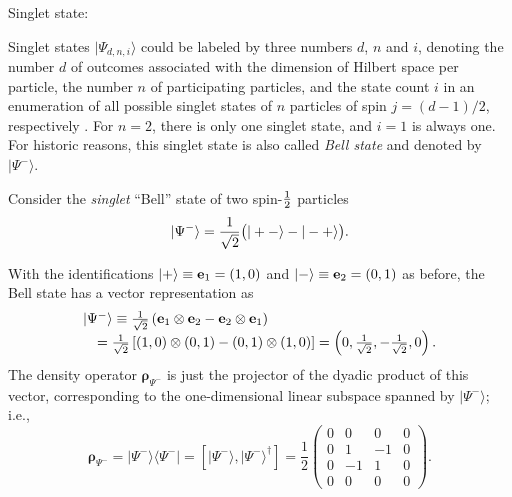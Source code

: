 {\begin{enumerate}
\end{enumerate}

{Singlet state:}




Singlet states $\vert \Psi_{d,n,i} \rangle$ could be labeled by three numbers $d$, $n$ and $i$,
denoting
the number $d$ of outcomes associated with the dimension of Hilbert space per particle,
the number $n$ of participating particles,
and the state count $i$ in an enumeration of all possible singlet states of $n$ particles of spin $j=(d-1)/2$, respectively
\cite{schimpf-svozil}.
For $n=2$, there is only one singlet state,
and $i=1$ is always one.
For historic reasons, this singlet state is also called {\em Bell state}  and denoted by $\vert {\Psi^-} \rangle $.

Consider the {\em singlet} ``Bell'' state of two spin-${1\over 2}$
particles
\begin{equation}
\vert {\Psi^-} \rangle
=
 {1\over \sqrt{2}}
\bigl(
\vert +- \rangle -
\vert -+ \rangle
\bigr)
.
\label{2009-gtq-s1s21}
\end{equation}

With the identifications
$
\vert +\rangle
\equiv {   {\bf e}}_1 =(1,0)
$
and
$
\vert -\rangle \equiv {   {\bf e}}_2 =(0,1)
$ as before,
the Bell state has a vector representation as
\begin{equation}
\begin{array}{lll}
\vert  {\Psi^-}\rangle
 \equiv
{1\over \sqrt{2}}\left({   {\bf e}}_1\otimes {   {\bf e}}_2-{   {\bf e}}_2\otimes {   {\bf e}}_1 \right) \\
\quad = {1\over \sqrt{2}}\left[ (1,0)\otimes (0,1) - (0,1) \otimes (1,0)\right]
=\left( 0,\frac{1}{\sqrt{2}},- \frac{1}{\sqrt{2}} ,  0 \right).
\end{array}
\label{2005-hp-ep12s1v}
\end{equation}
The density operator ${\boldsymbol{\rho}}_{{\Psi^-}}$
is just the projector of the dyadic product of this vector, corresponding to the one-dimensional
linear subspace spanned by  $\vert  {\Psi^-}\rangle $; i.e.,
\begin{equation}
{\boldsymbol{\rho}}_{{\Psi^-}} = \vert  {\Psi^-}\rangle \langle  {\Psi^-} \vert
=
\left[ \vert  {\Psi^-}\rangle ,\vert  {\Psi^-}\rangle^\dagger \right]
=
\frac{1}{2}
 \left(
\begin{array}{rrrr}
0&0&0&0\\
0&1&-1&0\\
0&-1&1&0\\
0&0&0&0
\end{array}
\right)
.
\end{equation}



}
